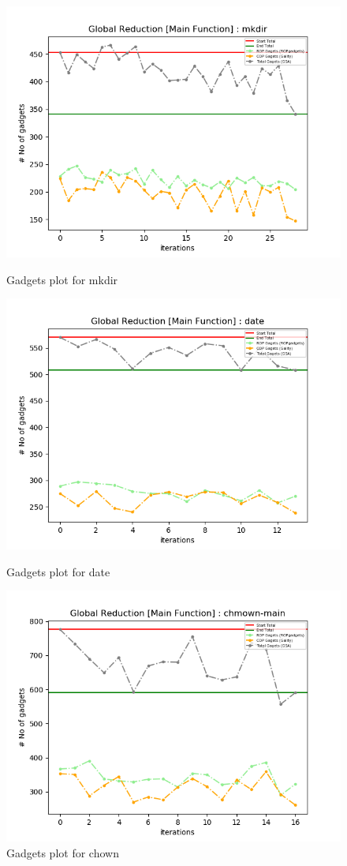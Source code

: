 \documentclass{relatorio}
\begin{document}
	\begin{figure}[H]
		\centering
		\captionsetup{justification=centering}
		\includegraphics[width=0.65\linewidth]{imgs/chisel_gadgets_mkdir_plot.png}
		\caption{Gadgets plot for \color{blue} mkdir}%
		\label{fig:plant}
		\centering
		\captionsetup{justification=centering}
		\includegraphics[width=0.65\linewidth]{imgs/chisel_gadgets_date_plot.png}
		\caption{Gadgets plot for \color{blue} date}%
		\label{fig:plant}
		\centering
		\captionsetup{justification=centering}
		\includegraphics[width=0.65\linewidth]{imgs/chisel_gadgets_chmown-main_plot.png}
		\caption{Gadgets plot for \color{blue} chown}%
		\label{fig:plant}
		\centering
		\captionsetup{justification=centering}

\end{figure}
\end{document}
